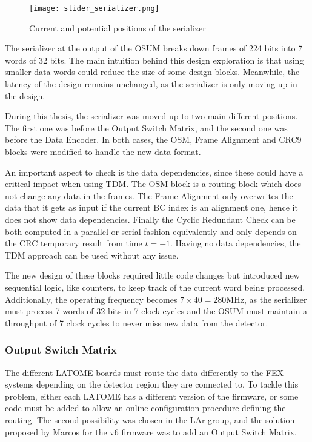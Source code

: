 \begin{figure}
    \centering
    \texttt{[image: slider\_serializer.png]}
    \caption{Current and potential positions of the serializer}
    \label{fig:slider-serializer}
\end{figure}

The serializer at the output of the OSUM breaks down frames of 224 bits into 7 words of 32 bits. The main intuition behind this design exploration is that using smaller data words could reduce the size of some design blocks. Meanwhile, the latency of the design remains unchanged, as the serializer is only moving up in the design.

During this thesis, the serializer was moved up to two main different positions. The first one was before the Output Switch Matrix, and the second one was before the Data Encoder. In both cases, the OSM, Frame Alignment and CRC9 blocks were modified to handle the new data format. 

An important aspect to check is the data dependencies, since these could have a critical impact when using TDM. The OSM block is a routing block which does not change any data in the frames. The Frame Alignment only overwrites the data that it gets as input if the current BC index is an alignment one, hence it does not show data dependencies. Finally the Cyclic Redundant Check can be both computed in a parallel or serial fashion equivalently and only depends on the CRC temporary result from time \(t=-1\). Having no data dependencies, the TDM approach can be used without any issue.

The new design of these blocks required little code changes but introduced new sequential logic, like counters, to keep track of the current word being processed. Additionally, the operating frequency becomes \(7\times40=280\)MHz, as the serializer must process 7 words of 32 bits in 7 clock cycles and the OSUM must maintain a throughput of 7 clock cycles to never miss new data from the detector.

\subsubsection{Output Switch Matrix}

The different LATOME boards must route the data differently to the FEX systems depending on the detector region they are connected to. To tackle this problem, either each LATOME has a different version of the firmware, or some code must be added to allow an online configuration procedure defining the routing. The second possibility was chosen in the LAr group, and the solution proposed by Marcos for the v6 firmware was to add an Output Switch Matrix. 

